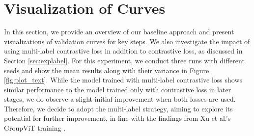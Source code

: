 % 
% 

% 
%

\section{Visualization of Curves}
In this section, we provide an overview of our baseline approach and present visualizations of validation curves for key steps. We also investigate the impact of using multi-label contrastive loss in addition to contrastive loss, as discussed in Section \ref{sec:explabel}. For this experiment, we conduct three runs with different seeds and show the mean results along with their variance in Figure \ref{fig:plot_text}. While the model trained with multi-label contrastive loss shows similar performance to the model trained only with contrastive loss in later stages, we do observe a slight initial improvement when both losses are used. Therefore, we decide to adopt the multi-label strategy, aiming to explore its potential for further improvement, in line with the findings from Xu et al.'s GroupViT training \cite{xu2022groupvit}.

